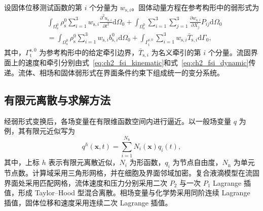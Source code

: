 设固体位移测试函数的第 $i$ 个分量为 $w_{\mathrm s,i}$。固体动量方程在参考构形中的弱形式为
\begin{equation}
\begin{aligned}
&\int_{\Omega_{\mathrm s}^0}
\rho_{\mathrm s}^0
\sum_{i=1}^{3}
w_{\mathrm s,i}
\frac{\partial^2u_{\mathrm s,i}}{\partial t^2}
\mathrm d\Omega_0
+
\int_{\Omega_{\mathrm s}^0}
\sum_{i=1}^{3}\sum_{j=1}^{3}
\frac{\partial w_{\mathrm s,i}}{\partial X_j}
P_{ij}
\mathrm d\Omega_0
\\
&=
\int_{\Omega_{\mathrm s}^0}
\rho_{\mathrm s}^0
\sum_{i=1}^{3}
w_{\mathrm s,i}b_{\mathrm s,i}^0
\mathrm d\Omega_0
+
\int_{\Gamma_{\mathrm t}^{\mathrm s,0}}
\sum_{i=1}^{3}
w_{\mathrm s,i}\bar T_{\mathrm s,i}
\mathrm d\Gamma_0,
\end{aligned}
\label{eq:ch2_weak_solid}
\end{equation}
其中，$\Gamma_{\mathrm t}^{\mathrm s,0}$ 为参考构形中的给定牵引边界，$\bar T_{\mathrm s,i}$ 为名义牵引的第 $i$ 个分量。流固界面上的速度和牵引分别由式~\eqref{eq:ch2_fsi_kinematic}和式~\eqref{eq:ch2_fsi_dynamic}传递。流体、相场和固体弱形式在界面条件约束下组成统一的变分系统。

\subsection{有限元离散与求解方法}
\label{subsec:ch2_discretization}

经弱形式变换后，各场变量在有限维函数空间内进行逼近。以一般场变量 $q$ 为例，其有限元近似写为
\begin{equation}
q^h(\boldsymbol{x},t)
=
\sum_{i=1}^{N_{\mathrm n}}
N_i(\boldsymbol{x})q_i(t),
\label{eq:ch2_fe_interpolation}
\end{equation}
其中，上标 $h$ 表示有限元离散近似，$N_i$ 为形函数，$q_i$ 为节点自由度，$N_{\mathrm n}$ 为单元节点数。计算域采用三角形网格，并在细胞及界面邻域加密。复合液滴模型在流固界面处采用匹配网格，流体速度和压力分别采用二次 $P_2$ 与一次 $P_1$ Lagrange 插值，形成 Taylor--Hood 型混合离散\cite{taylor1973numerical}。相场变量与化学势采用同阶连续 Lagrange 插值，固体位移和速度采用连续二次 Lagrange 插值。

